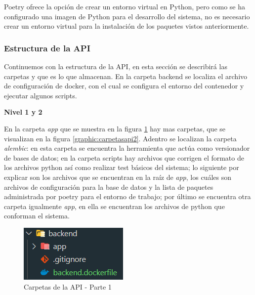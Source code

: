 Poetry ofrece la opción de crear un entorno virtual en Python, pero como se ha configurado una imagen de Python para el desarrollo del sistema, no es necesario crear un entorno virtual para la instalación de los paquetes vistos anteriormente.

\subsubsection{Estructura de la API}
Continuemos con la estructura de la API, en esta sección se describirá las carpetas y que es lo que almacenan. En la carpeta backend se localiza el archivo de configuración de docker, con el cual se configura el entorno del contenedor y ejecutar algunos scripts. 

\textbf{Nivel 1 y 2}

En la carpeta \textit{app} que se muestra en la figura \ref{graphic:carpetasapi1} hay mas carpetas, que se visualizan en la figura \ref{graphic:carpetasapi2}. Adentro se localizan la carpeta \textit{alembic}: en esta carpeta se encuentra la herramienta que actúa como versionador de bases de datos; en la carpeta scripts hay archivos que corrigen el formato de los archivos python así como realizar test básicos del sistema; lo siguiente por explicar son los archivos que se encuentran en la raíz de \textit{app}, los cuáles son archivos de configuración para la base de datos y la lista de paquetes administrada por poetry para el entorno de trabajo; por último se encuentra otra carpeta igualmente \textit{app}, en ella se encuentran los archivos de python que conforman el sistema.

\begin{figure}[!htb]
    \centering
    \includegraphics[scale=1]{TT/img/implementacion/carpeta-api-1.png}
    \caption{Carpetas de la API - Parte 1}
    \label{graphic:carpetasapi1}    
\end{figure}

